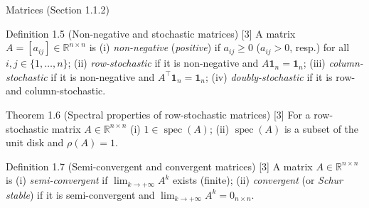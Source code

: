 

\begin{frame}[label=bk-prelim]{Matrices (Section 1.1.2)}
  \scriptsize
  \begin{block}{Definition 1.5 (Non-negative and stochastic matrices) [3]}
    A matrix $A = [a_{ij}] \in \mathbb{R}^{n \times n}$ is
    (i) \emph{non-negative} (\emph{positive}) if $a_{ij} \geq 0$ ($a_{ij} > 0$, resp.) for
    all $i, j \in \{1, \dots, n\}$;
    (ii) \emph{row-stochastic} if it is non-negative and $A \mathbf{1}_n = \mathbf{1}_n$;
    (iii) \emph{column-stochastic} if it is non-negative and
    $A^\top \mathbf{1}_n = \mathbf{1}_n$;
    (iv) \emph{doubly-stochastic} if it is row- and column-stochastic.
  \end{block}
  \begin{block}{Theorem 1.6 (Spectral properties of row-stochastic matrices) [3]}
    For a row-stochastic matrix $A \in \mathbb{R}^{n \times n}$
    (i) $1 \in \operatorname{spec}(A)$;
    (ii) $\operatorname{spec}(A)$ is a subset of the unit disk and $\rho(A) = 1$.
  \end{block}
  \begin{block}{Definition 1.7 (Semi-convergent and convergent matrices) [3]}
    A matrix $A \in \mathbb{R}^{n \times n}$ is
    (i) \emph{semi-convergent} if $\lim_{k \to +\infty} A^k$ exists (finite);
    (ii) \emph{convergent} (or \emph{Schur stable}) if it is semi-convergent and
    $\lim_{k \to +\infty} A^k = 0_{n \times n}$.
  \end{block}
\end{frame}

